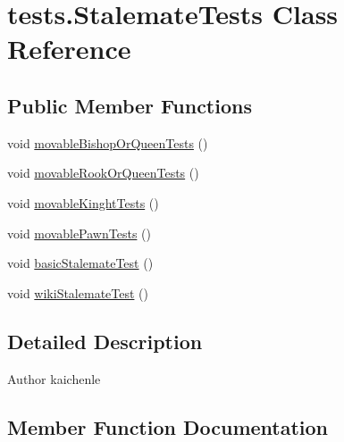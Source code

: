 \hypertarget{classtests_1_1_stalemate_tests}{}\section{tests.\+Stalemate\+Tests Class Reference}
\label{classtests_1_1_stalemate_tests}
\subsection*{Public Member Functions}
\begin{DoxyCompactItemize}
\item 
void \mbox{\hyperlink{classtests_1_1_stalemate_tests_a20c3f727a381198c62311aab0e76f53d}{movable\+Bishop\+Or\+Queen\+Tests}} ()
\item 
void \mbox{\hyperlink{classtests_1_1_stalemate_tests_a986921c05431c7eaaed69a8b2f63aee1}{movable\+Rook\+Or\+Queen\+Tests}} ()
\item 
void \mbox{\hyperlink{classtests_1_1_stalemate_tests_a1c33d7510b52a84bdbe26b101b52972d}{movable\+Kinght\+Tests}} ()
\item 
void \mbox{\hyperlink{classtests_1_1_stalemate_tests_a0202b8146eec4cec68329eec56dc71e4}{movable\+Pawn\+Tests}} ()
\item 
void \mbox{\hyperlink{classtests_1_1_stalemate_tests_a81624d7ceeff6b67b2c35d0cef08f467}{basic\+Stalemate\+Test}} ()
\item 
void \mbox{\hyperlink{classtests_1_1_stalemate_tests_a4873edea4e4df4a2d093a0da968c2ce9}{wiki\+Stalemate\+Test}} ()
\end{DoxyCompactItemize}


\subsection{Detailed Description}
\begin{DoxyAuthor}{Author}
kaichenle 
\end{DoxyAuthor}


\subsection{Member Function Documentation}
\mbox{\label{classtests_1_1_stalemate_tests_a81624d7ceeff6b67b2c35d0cef08f467}} 
